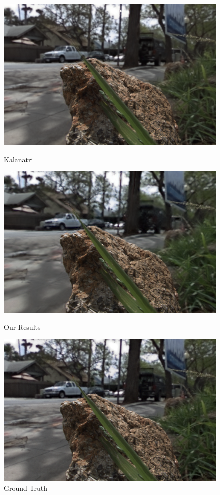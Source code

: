 \documentclass[10pt,twocolumn,letterpaper]{article}
\begin{document}
\begin{figure}[h]
\begin{multicols}{3}
    \end{multicols}
    \begin{multicols}{3}
        \includegraphics[width=\linewidth]{rock/kalantari_05_05.png}\par\caption*{Kalanatri \etal}
        \includegraphics[width=\linewidth]{rock/ours_05_05.png}\par\caption*{Our Results}
        \includegraphics[width=\linewidth]{rock/truth_05_05.png}\par\caption*{Ground Truth}

\end{multicols}
\end{figure}
\end{document}
